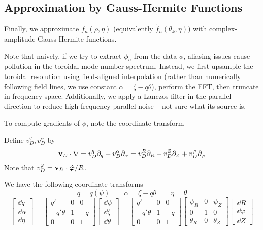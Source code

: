 \documentclass[]{article}
\begin{document}
\subsection{Approximation by Gauss-Hermite Functions}

Finally, we approximate \(f_n(\rho,\eta)\) (equivalently \(\tilde{f}_n(\theta_k, \eta)\)) with complex-amplitude Gauss-Hermite functions.

Note that naively, if we try to extract \(\phi_n\) from the data \(\phi\), aliasing issues cause pollution in the toroidal mode number spectrum.
Instead, we first upsample the toroidal resolution using field-aligned interpolation (rather than numerically following field lines, we use constant \(\alpha=\zeta - q \theta\)), perform the FFT, then truncate in frequency space.
Additionally, we apply a Lanczos filter in the parallel direction to reduce high-frequency parallel noise -- not sure what its source is.

To compute gradients of \(\phi\), note the coordinate transform

Define \(v_D^q,v_D^\alpha\) by
\begin{equation*}
	\vb{v}_D\cdot \nabla = v_D^q \partial_q + v_D^\alpha \partial_\alpha = v_D^R \partial_R + v_D^Z \partial_Z + v_D^\varphi \partial_\varphi
\end{equation*}
Note that \(v_D^\varphi = \vb{v}_D \cdot \vu*{\varphi} / R\).

We have the following coordinate transforms
\begin{equation*}
	q = q(\psi) \qquad \alpha = \zeta - q \theta \qquad \eta = \theta
\end{equation*}
\begin{equation*}
	\begin{bmatrix}
		\dd{q} \\ \dd{\alpha} \\ \dd{\eta}
	\end{bmatrix}
	=
	\begin{bmatrix}
		q' & 0 & 0 \\
		-q' \theta & 1 & -q \\
		0 & 0 & 1
	\end{bmatrix}
	\begin{bmatrix}
		\dd{\psi} \\ \dd{\zeta} \\ \dd{\theta}
	\end{bmatrix}
	=
	\begin{bmatrix}
		q' & 0 & 0 \\
		-q' \theta & 1 & -q \\
		0 & 0 & 1
	\end{bmatrix}
	\begin{bmatrix}
		\psi_R & 0 & \psi_Z \\
		0 & 1 & 0 \\
		\theta_R & 0 & \theta_Z
	\end{bmatrix}
	\begin{bmatrix}
		\dd{R} \\ \dd{\varphi} \\ \dd{Z}
	\end{bmatrix}
\end{equation*}
\end{document}
